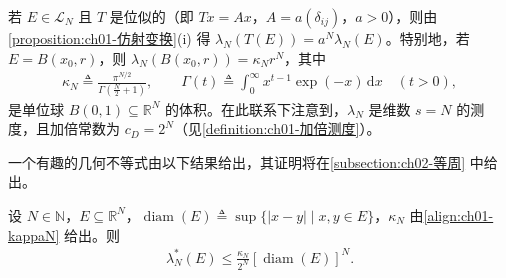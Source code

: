 \documentclass[../../main.tex]{subfiles}%
\begin{document}
\begin{remark}\label{remark:ch01-位似}
若 $E\in\mathcal{L}_N$ 且 $T$ 是位似的（即 $Tx=Ax$，$A=a(\delta_{ij})$，$a>0$），则由\cref{proposition:ch01-仿射变换}(i) 得 $\lambda_N(T(E))=a^N\lambda_N(E)$。特别地，若 $E=B(x_0,r)$，则 $\lambda_N(B(x_0,r))=\kappa_Nr^N$，其中
\begin{align}
\kappa_N\triangleq\frac{\pi^{N/2}}{\Gamma\left(\frac{N}{2}+1\right)},\qquad
\Gamma(t)\triangleq\int_0^\infty x^{t-1}\exp(-x)\,\mathrm{d}x\quad(t>0), \label{align:ch01-kappaN}
\end{align}
是单位球 $B(0,1)\subseteq\mathbb{R}^N$ 的体积。在此联系下注意到，$\lambda_N$ 是维数 $s=N$ 的测度，且加倍常数为 $c_D=2^N$（见\cref{definition:ch01-加倍测度}）。
\end{remark}

一个有趣的几何不等式由以下结果给出，其证明将在\cref{subsection:ch02-等周} 中给出。

\begin{proposition}[等直径不等式]\label{proposition:ch01-等直径}\label{proposition:ch01-等直径不等式}
设 $N\in\mathbb{N}$，$E\subseteq\mathbb{R}^N$，$\operatorname{diam}(E)\triangleq\sup\{|x-y|\mid x,y\in E\}$，$\kappa_N$ 由\eqref{align:ch01-kappaN} 给出。则
\begin{align}
\lambda_N^*(E)\leqslant\frac{\kappa_N}{2^N}[\operatorname{diam}(E)]^N. \label{align:ch01-等直径}
\end{align}
\end{proposition}
\end{document}
